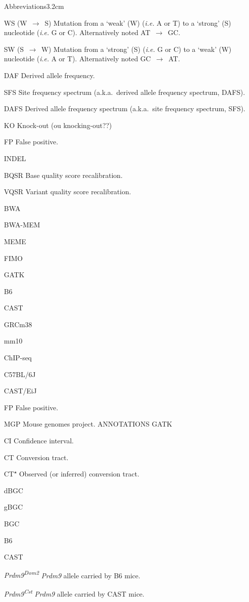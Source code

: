\begin{mclistof}{Abbreviations}{3.2cm}
\item[WS (W~$\rightarrow$~S)] Mutation from a ‘weak’ (W) (\textit{i.e.} A or T) to a ‘strong’ (S) nucleotide (\textit{i.e.} G or C). Alternatively noted AT~$\rightarrow$~GC\@.
\item[SW (S~$\rightarrow$~W)] Mutation from a ‘strong’ (S) (\textit{i.e.} G or C) to a ‘weak’ (W) nucleotide (\textit{i.e.} A or T). Alternatively noted GC~$\rightarrow$~AT\@.
\item[DAF] Derived allele frequency.
\item[SFS] Site frequency spectrum (a.k.a.\ derived allele frequency spectrum, DAFS).
\item[DAFS] Derived allele frequency spectrum (a.k.a.\ site frequency spectrum, SFS).
\item[KO] Knock-out (ou knocking-out??)
\item[FP] False positive.
\item[INDEL]
\item[BQSR] Base quality score recalibration.
\item[VQSR] Variant quality score recalibration.
\item[BWA]
\item[BWA-MEM]
\item[MEME]
\item[FIMO]
\item[GATK]
\item[B6]
\item[CAST]
\item[GRCm38]
\item[mm10]
\item[ChIP-seq]
\item[C57BL/6J]
\item[CAST/EiJ]
\item[FP] False positive.
\item[MGP] Mouse genomes project.
	ANNOTATIONS GATK
\item[CI] Confidence interval.
\item[CT] Conversion tract.
\item[CT\textsuperscript{$\star$}] Observed (or inferred) conversion tract.
\item[dBGC]
\item[gBGC]
\item[BGC]
\item[B6]
\item[CAST]
\item[\textit{Prdm9\textsuperscript{Dom2}}] \textit{Prdm9} allele carried by B6 mice.
\item[\textit{Prdm9\textsuperscript{Cst}}] \textit{Prdm9} allele carried by CAST mice.

\end{mclistof}
